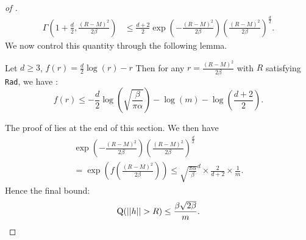 \begin{noaddcontents}
\begin{proof}[of ]
\begin{align*}
\Gamma\left(1+\frac{d}{2}, \frac{(R-M)^2}{2\beta}\right) & \leq \frac{d+2}{2}\exp\left({-\frac{(R-M)^2}{2\beta}} \right) \left(\frac{(R-M)^2}{2\beta}\right)^{\frac{d}{2}}.
\end{align*}
We now control this quantity through the following lemma.
\begin{lemma}
\label{l: calculus}
Let $d\geq 3$, $f(r)= \frac{d}{2}\log(r) -r$ Then for any $r=\frac{(R-M)^2}{2\beta}$ with $R$ satisfying \texttt{Rad}, we have :
\[f(r) \leq -\frac{d}{2}\log\left(\sqrt{\frac{\beta}{\pi\alpha}}\right) - \log(m)- \log\left(\frac{d+2}{2}\right).\]
\end{lemma}
The proof of  lies at the end of this section.
We then have
\begin{multline*}
     \exp\left({-\frac{(R-M)^2}{2\beta}} \right) \left(\frac{(R-M)^2}{2\beta}\right)^{\frac{d}{2}} \\
     = \exp\left(f \left( \frac{(R-M)^2}{2\beta} \right)\right) \leq
    \sqrt{\frac{\pi\alpha}{\beta}}^{d} \times \frac{2}{d+2} \times \frac{1}{m} . 
\end{multline*}
Hence the final bound:
\[ \Q(||h||>R)  \leq  \frac{\beta\sqrt{2\beta}}{m} .  \]




\end{proof}
\end{noaddcontents}
